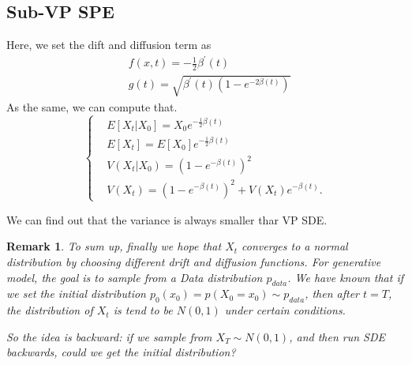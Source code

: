 \documentclass{ctexart}
\newtheorem{remark}{Remark}
\begin{document}
\subsection{Sub-VP SPE}
Here, we set the dift and diffusion term as
\begin{equation}
\begin{aligned}
        &f(x, t)=-\frac{1}{2} \beta^{\prime}(t) \\
        &g(t)=\sqrt{\beta^{\prime}(t)\left(1-e^{-2 \beta(t)}\right)}
\end{aligned}
\end{equation}
As the same, we can compute that.
\begin{equation}
    \left\{\begin{aligned}
    &E\left[X_{t} | X_{0}\right]=X_{0} e^{-\frac{1}{2} \beta(t)} \\
    &E\left[X_{t}\right]=E\left[X_{0}\right] e^{-\frac{1}{2} \beta(t)} \\
    &V\left(X_{t} | X_{0}\right)=\left(1-e^{-\beta(t)}\right)^{2} \\
    &V\left(X_{t}\right)=\left(1-e^{-\beta(t)}\right)^{2}+V\left(X_{t}\right) e^{-\beta(t)} .
    \end{aligned}\right.
\end{equation}

We can find out that the variance is always smaller thar VP SDE.

\begin{remark}
    To sum up, finally we hope that $X_t$ converges to a normal distribution by choosing different drift and diffusion functions. 
    For generative model, the goal is to sample from a Data distribution $p_{data}$. We have known that if we set the initial distribution $p_0(x_0)=p(X_0=x_0)\sim p_{data}$, 
    then after $t=T$, the distribution of $X_t$ is tend to be $N(0, 1)$ under certain conditions. 
    
    So the idea is backward: if we sample from $X_T\sim N(0, 1)$, and then run SDE backwards, could we get the initial distribution?
\end{remark}
\end{document}
